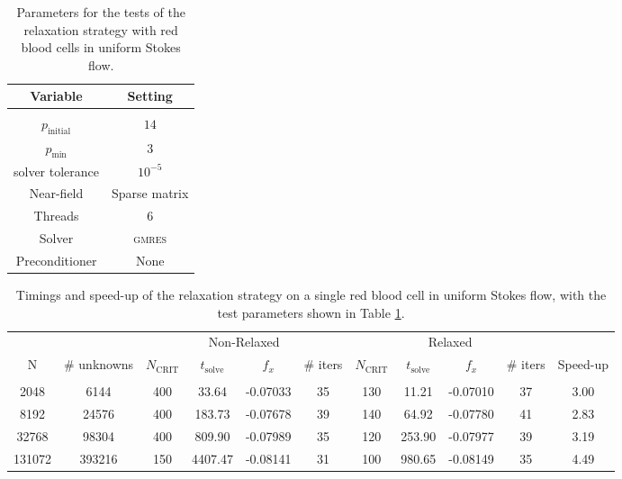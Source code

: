 \documentclass[final,3p,times]{elsarticle}
\newcommand{\ncrit}{N_{\text{CRIT}}}
\newcommand{\tsolve}{t_{\text{solve}}}
\newcommand{\gmres}{\textsc{gmres}\xspace}
\begin{document}
\begin{table}[h]
\footnotesize
\begin{center}
\begin{tabular}{c|c}
 Variable & Setting \\ 
\hline
 & \\
 $p_{\text{initial}}$ & $14$ \\
 $p_{\text{min}}$ &  $3$ \\
 solver tolerance & $10^{-5}$ \\
 Near-field & Sparse matrix \\
 Threads & $6$ \\
 Solver & {\gmres} \\ 
 Preconditioner & None
\end{tabular}
\end{center}
\caption{Parameters for the tests of the relaxation strategy with red blood cells in uniform Stokes flow.}
\label{tab:cells_relaxation_settings}
\end{table}%


\begin{table}[htp]
\footnotesize
\begin{center}
\begin{tabular}{c|c|cccc|cccc|c}
  & & \multicolumn{4}{c|}{Non-Relaxed} & \multicolumn{4}{c|}{Relaxed} &  \\
  N & \# unknowns & $\ncrit$ & $\tsolve$ & $f_x$ & \# iters & $\ncrit$ & $\tsolve$ & $f_x$ & \# iters & Speed-up\\
 \hline
   & & & & & & & & & &\\
  2048 & 6144 & 400 & 33.64 & -0.07033 & 35 & 130 & 11.21 & -0.07010 & 37 & 3.00\\
  8192 & 24576 & 400 & 183.73 & -0.07678 & 39 & 140 & 64.92 & -0.07780 & 41 & 2.83\\
  32768 & 98304 & 400 & 809.90 & -0.07989 & 35 & 120 & 253.90 & -0.07977 & 39 & 3.19\\
  131072 & 393216 & 150 & 4407.47 & -0.08141 & 31 & 100 & 980.65 & -0.08149 & 35 & 4.49\\
\end{tabular}
\end{center}
\caption{Timings and speed-up of the relaxation strategy on a single red blood cell in uniform Stokes flow, with the test parameters shown in Table \ref{tab:cells_relaxation_settings}.}
\label{tab:single_cell_relaxation_results}
\end{table}%
\end{document}
